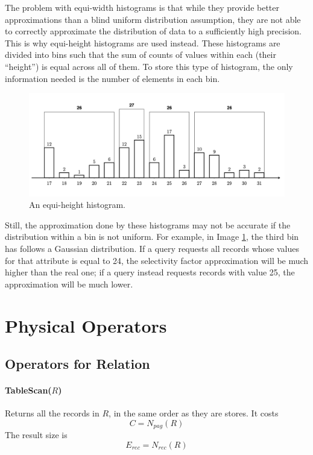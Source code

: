 The problem with equi-width histograms is that while they provide better approximations than a blind uniform distribution assumption, they are not able to correctly approximate the distribution of data to a sufficiently high precision. This is why equi-height histograms are used instead. These histograms are divided into bins such that the sum of counts of values within each (their ``height'') is equal across all of them. To store this type of histogram, the only information needed is the number of elements in each bin.

\begin{figure}[h]
    \centering
    \includegraphics[width=0.7\linewidth]{img/equiheight.png}
    \caption{An equi-height histogram.}
    \label{fig:equi-height}
\end{figure}

Still, the approximation done by these histograms may not be accurate if the distribution within a bin is not uniform. For example, in Image \ref{fig:equi-height}, the third bin has follows a Gaussian distribution. If a query requests all records whose values for that attribute is equal to 24, the selectivity factor approximation will be much higher than the real one; if a query instead requests records with value 25, the approximation will be much lower.

\section{Physical Operators}

\subsection{Operators for Relation}

\paragraph{TableScan($R$)}
Returns all the records in $R$, in the same order as they are stores. It costs
\begin{equation*}
    C = N_{pag}(R)
\end{equation*}
The result size is
\begin{equation*}
    E_{rec} = N_{rec}(R)
\end{equation*}

